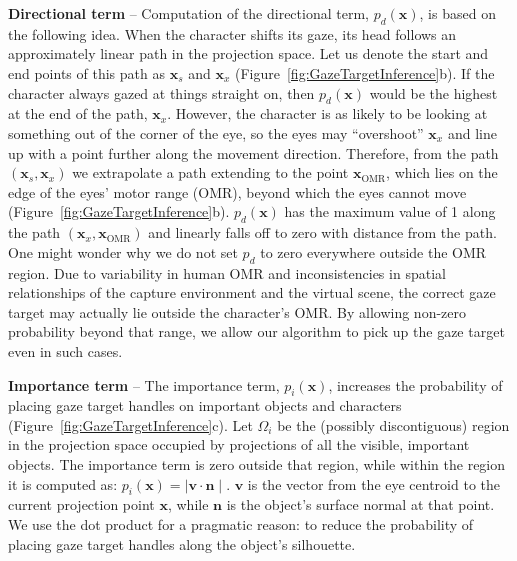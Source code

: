 \noindent\textbf{Directional term} -- Computation of the directional term, $p_d(\mathbf{x})$, is based on the following idea. When the character shifts its gaze, its head follows an approximately linear path in the projection space. Let us denote the start and end points of this path as $\mathbf{x}_s$ and $\mathbf{x}_x$ (Figure~\ref{fig:GazeTargetInference}b). If the character always gazed at things straight on, then $p_d(\mathbf{x})$ would be the highest at the end of the path, $\mathbf{x}_x$. However, the character is as likely to be looking at something out of the corner of the eye, so the eyes may ``overshoot'' $\mathbf{x}_x$ and line up with a point further along the movement direction. Therefore, from the path $(\mathbf{x}_s, \mathbf{x}_x)$ we extrapolate a path extending to the point $\mathbf{x}_{\mathrm{OMR}}$, which lies on the edge of the eyes' motor range (OMR), beyond which the eyes cannot move (Figure~\ref{fig:GazeTargetInference}b). $p_d(\mathbf{x})$ has the maximum value of 1 along the path $(\mathbf{x}_x, \mathbf{x}_{\mathrm{OMR}})$ and linearly falls off to zero with distance from the path.%
%
%
One might wonder why we do not set $p_d$ to zero everywhere outside the OMR region. Due to variability in human OMR and inconsistencies in spatial relationships of the capture environment and the virtual scene, the correct gaze target may actually lie outside the character's OMR. By allowing non-zero probability beyond that range, we allow our algorithm to pick up the gaze target even in such cases.

\noindent\textbf{Importance term} -- The importance term, $p_i(\mathbf{x})$, increases the probability of placing gaze target handles on important objects and characters (Figure~\ref{fig:GazeTargetInference}c). Let $\Omega_i$ be the (possibly discontiguous) region in the projection space occupied by projections of all the visible, important objects. The importance term is zero outside that region, while within the region it is computed as: $p_i(\mathbf{x}) = \mid \mathbf{v} \cdot \mathbf{n} \mid$. $\mathbf{v}$ is the vector from the eye centroid to the current projection point $\mathbf{x}$, while $\mathbf{n}$ is the object's surface normal at that point. We use the dot product for a pragmatic reason: to reduce the probability of placing gaze target handles along the object's silhouette.

